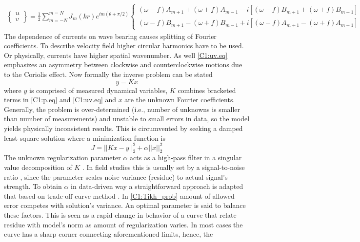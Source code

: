 \documentclass[12pt]{article}
\begin{document}
\begin{align}
\label{C1:uv.eq}
\begin{Bmatrix}
u \\ v
\end{Bmatrix}
= \frac{1}{2} \sum_{m = -N}^{m = N} J_{m} (kr) e^{im(\theta + \pi/2)}
\begin{Bmatrix}
(\omega - f) A_{m + 1} + (\omega + f) A_{m - 1} - i [(\omega - f) B_{m + 1} + (\omega + f) B_{m - 
	1}] \\ 
(\omega - f) B_{m + 1} - (\omega + f) B_{m - 1} + i [ (\omega - f) A_{m + 1} - (\omega + f) A_{m - 
	1}]
\end{Bmatrix}
\end{align}
The dependence of currents on wave bearing causes splitting of Fourier coefficients. To describe 
velocity field higher circular harmonics have to be used. Or physically, currents have higher 
spatial wavenumber. As well \eqref{C1:uv.eq} emphasizes an asymmetry between clockwise 
and counterclockwise motions due to the Coriolis effect. Now formally the inverse problem can be stated 
\begin{equation}
y = K x
\end{equation}
where $y$ is comprised of measured dynamical variables, $K$ combines bracketed terms in 
\eqref{C1:p.eq} and \eqref{C1:uv.eq} and $x$ are the unknown Fourier coefficients. Generally, the 
problem is over-determined (i.e., number of unknowns is smaller than number of 
measurements) and unstable to small errors in data, so the model yields physically inconsistent 
results. This is circumvented by seeking a damped least square solution \citep{munk2009ocean} where 
a minimization function is 
\begin{equation}
\label{C1:Tikh_prob}
J = ||K x - y||^2_2 + \alpha ||x||^2_2
\end{equation}
The unknown regularization parameter $\alpha$ acts as a high-pass filter in a singular value 
decomposition of $K$ \citep{bennett1992inverse}. In field studies this is usually set by a 
signal-to-noise ratio \citep{munk2009ocean}, since the parameter scales noise variance (residue) 
to actual signal's strength. To obtain $\alpha$ in data-driven way a straightforward approach is 
adapted that based on 
trade-off curve method \citep{hansen1993use}. In \eqref{C1:Tikh_prob} amount of allowed error 
competes with solution's variance. An optimal parameter is said to balance these factors. This is 
seen as a rapid change in behavior of a curve that relate residue with model's norm as amount of regularization varies. In most cases the curve has a sharp corner connecting aforementioned limits, hence, the 
\end{document}
